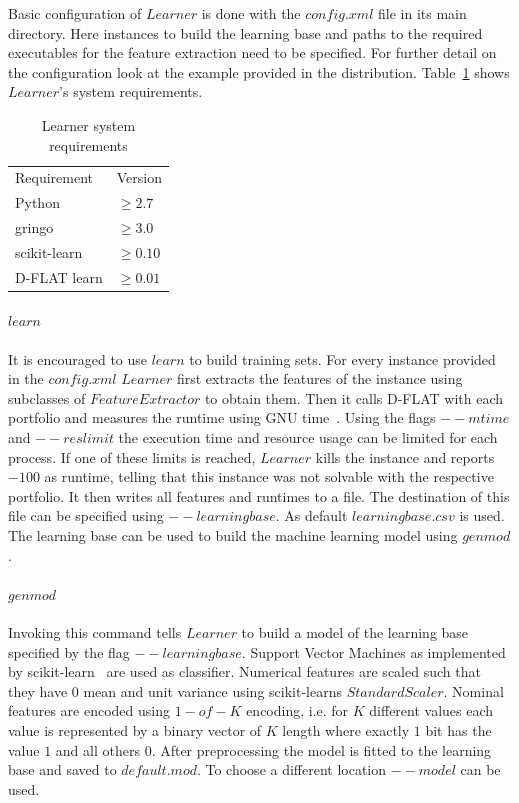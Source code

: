 Basic configuration of \inline$Learner$ is done with the \inline$config.xml$ file in its main directory. Here instances to build the learning base and paths to the required executables for the feature extraction need to be specified. For further detail on the configuration look at the example provided in the distribution. Table~\ref{tbl:req} shows \inline$Learner$'s system requirements.

\begin{table}[h]
	\center
	\begin{tabular}{ll}
		Requirement & Version\\
		Python & $\geq2.7$\\
		gringo & $\geq3.0$\\
		scikit-learn & $\geq0.10$\\
		\mbox{D-FLAT} learn & $\geq0.01$
	\end{tabular}
	\caption{Learner system requirements \label{tbl:req}}
\end{table}

\paragraph{\inline$learn$}
It is encouraged to use \inline$learn$ to build training sets. For every instance provided in the \inline$config.xml$ \inline$Learner$ first extracts the features of the instance using subclasses of \inline$FeatureExtractor$ to obtain them. Then it calls \mbox{D-FLAT} with each portfolio and measures the runtime using GNU time~\cite{www:time}.
Using the flags \inline$--mtime$ and \inline$--reslimit$ the execution time and resource usage can be limited for each process. If one of these limits is reached, \inline$Learner$ kills the instance and reports $-100$ as runtime, telling that this instance was not solvable with the respective portfolio. It then writes all features and runtimes to a file. The destination of this file can be specified using \inline$--learningbase$. As default \inline$learningbase.csv$ is used. The learning base can be used to build the machine learning model using \inline$genmod$.

\paragraph{\inline$genmod$}
Invoking this command tells \inline$Learner$ to build a model of the learning base specified by the flag \inline$--learningbase$. Support Vector Machines as implemented by scikit-learn~\cite{www:scikit} are used as classifier. Numerical features are scaled such that they have $0$ mean and unit variance using scikit-learns \inline$StandardScaler$. 
Nominal features are encoded using \inline$1-of-K$ encoding, i.e. for $K$ different values each value is represented by a binary vector of $K$ length where exactly $1$ bit has the value $1$ and all others $0$.
After preprocessing the model is fitted to the learning base and saved to \inline$default.mod$. To choose a different location \inline$--model$ can be used.


